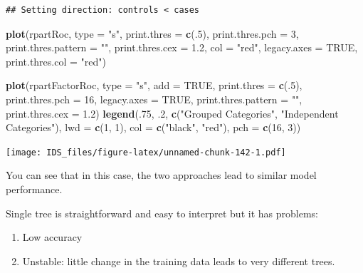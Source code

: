 \documentclass[12pt,]{krantz}
\makeatletter
\newenvironment{Shaded}{\begin{snugshade}}{\end{snugshade}}
\newcommand{\DataTypeTok}[1]{\textcolor[rgb]{0.27,0.27,0.27}{#1}}
\newcommand{\DecValTok}[1]{\textcolor[rgb]{0.06,0.06,0.06}{#1}}
\newcommand{\FloatTok}[1]{\textcolor[rgb]{0.06,0.06,0.06}{#1}}
\newcommand{\KeywordTok}[1]{\textcolor[rgb]{0.27,0.27,0.27}{\textbf{#1}}}
\newcommand{\NormalTok}[1]{#1}
\newcommand{\OtherTok}[1]{\textcolor[rgb]{0.37,0.37,0.37}{#1}}
\newcommand{\StringTok}[1]{\textcolor[rgb]{0.5,0.5,0.5}{#1}}
\providecommand{\tightlist}{%
  \setlength{\itemsep}{0pt}\setlength{\parskip}{0pt}}
\newenvironment{kframe}{%
\medskip{}
\setlength{\fboxsep}{.8em}
 \def\at@end@of@kframe{}%
 \ifinner\ifhmode%
  \def\at@end@of@kframe{\end{minipage}}%
  \begin{minipage}{\columnwidth}%
 \fi\fi%
 \def\FrameCommand##1{\hskip\@totalleftmargin \hskip-\fboxsep
 \colorbox{shadecolor}{##1}\hskip-\fboxsep
     \hskip-\linewidth \hskip-\@totalleftmargin \hskip\columnwidth}%
 \MakeFramed {\advance\hsize-\width
   \@totalleftmargin\z@ \linewidth\hsize
   \@setminipage}}%
 {\par\unskip\endMakeFramed%
 \at@end@of@kframe}
\renewenvironment{Shaded}{\begin{kframe}}{\end{kframe}}
\makeatother
\begin{document}
\begin{verbatim}
## Setting direction: controls < cases
\end{verbatim}

\begin{Shaded}
\begin{Highlighting}[]
\KeywordTok{plot}\NormalTok{(rpartRoc, }\DataTypeTok{type =} \StringTok{"s"}\NormalTok{, }\DataTypeTok{print.thres =} \KeywordTok{c}\NormalTok{(.}\DecValTok{5}\NormalTok{),}
     \DataTypeTok{print.thres.pch =} \DecValTok{3}\NormalTok{,}
     \DataTypeTok{print.thres.pattern =} \StringTok{""}\NormalTok{,}
     \DataTypeTok{print.thres.cex =} \FloatTok{1.2}\NormalTok{,}
     \DataTypeTok{col =} \StringTok{"red"}\NormalTok{, }\DataTypeTok{legacy.axes =} \OtherTok{TRUE}\NormalTok{,}
     \DataTypeTok{print.thres.col =} \StringTok{"red"}\NormalTok{)}

\KeywordTok{plot}\NormalTok{(rpartFactorRoc,}
     \DataTypeTok{type =} \StringTok{"s"}\NormalTok{,}
     \DataTypeTok{add =} \OtherTok{TRUE}\NormalTok{,}
     \DataTypeTok{print.thres =} \KeywordTok{c}\NormalTok{(.}\DecValTok{5}\NormalTok{),}
     \DataTypeTok{print.thres.pch =} \DecValTok{16}\NormalTok{, }\DataTypeTok{legacy.axes =} \OtherTok{TRUE}\NormalTok{,}
     \DataTypeTok{print.thres.pattern =} \StringTok{""}\NormalTok{,}
     \DataTypeTok{print.thres.cex =} \FloatTok{1.2}\NormalTok{)}
\KeywordTok{legend}\NormalTok{(.}\DecValTok{75}\NormalTok{, }\FloatTok{.2}\NormalTok{,}
       \KeywordTok{c}\NormalTok{(}\StringTok{"Grouped Categories"}\NormalTok{, }\StringTok{"Independent Categories"}\NormalTok{),}
       \DataTypeTok{lwd =} \KeywordTok{c}\NormalTok{(}\DecValTok{1}\NormalTok{, }\DecValTok{1}\NormalTok{),}
       \DataTypeTok{col =} \KeywordTok{c}\NormalTok{(}\StringTok{"black"}\NormalTok{, }\StringTok{"red"}\NormalTok{),}
       \DataTypeTok{pch =} \KeywordTok{c}\NormalTok{(}\DecValTok{16}\NormalTok{, }\DecValTok{3}\NormalTok{))}
\end{Highlighting}
\end{Shaded}

\texttt{[image: IDS\_files/figure-latex/unnamed-chunk-142-1.pdf]}

You can see that in this case, the two approaches lead to similar model performance.

Single tree is straightforward and easy to interpret but it has problems:

\begin{enumerate}
\def\labelenumi{\arabic{enumi}.}
\tightlist
\item
  Low accuracy
\item
  Unstable: little change in the training data leads to very different trees.
\end{enumerate}
\end{document}
